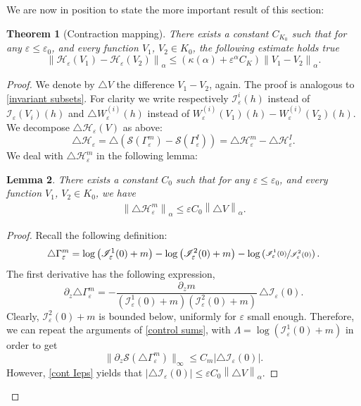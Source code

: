 \documentclass[10pt]{amsart}
\let\mathcal\mathscr
\newcommand{\cI}{\mathcal{I}}
\newcommand{\cS}{\mathcal{S}}
\theoremstyle{plain}
\newtheorem{thm}{Theorem}[section]
\newtheorem{lem}[thm]{Lemma}
\theoremstyle{definition}
\renewcommand{\H}{\mathcal{H}_\eps}
\let\eps\varepsilon
\newcommand{\nalph}[1]{\left\lVert#1\right\rVert_\alpha}
\newcommand{\Gammam}{\Gamma^m_{\eps}}
\newcommand{\GammaI}{\Gamma^I_{\eps}}
\begin{document}
We are now in position to state the more important result of this section:

\begin{thm}[Contraction mapping]\label{contraction mapping}
There exists a constant $C_{K_0}$ such that for any $\eps\leq \eps_0$, and every function $V_1$, $V_2 \in K_0$, the following estimate holds true
\begin{equation}\label{eq: contraction th}
\nalph{ \H(V_1)- \H(V_2)} \leq (\kappa(\alpha) + \eps^\alpha C_K)\nalph{V_1-V_2}.
\end{equation}
\end{thm}
\begin{proof}
We denote by $\triangle V$ the difference $V_1 - V_2$, again.
The proof is analogous to \cref{invariant subsets}.
For clarity we write respectively $\cI_\eps^i(h) $ instead of $\cI_\eps(V_i) (h)$ and $\triangle W_\eps^{(i)}(h)$ instead of $W_\eps^{(i)}(V_1) (h)-W_\eps^{(i)}(V_2) (h)$.
We decompose $ \triangle \H(V)$ as above:
\begin{equation*}
\triangle \H = \triangle \left (\cS(\Gammam) - \cS(\GammaI)\right) = \triangle \H^m - \triangle \H^I.
\end{equation*}
We deal with $\triangle \H^m$ in the following lemma:
\begin{lem}\label{unif bound affpart diff}
There exists a constant $C_{0}$ such that for any $\eps\leq \eps_0$, and every function $V_1$, $V_2 \in K_0$, we have
\begin{align*}
\nalph{\triangle \H^m} \leq \eps C_0 \nalph{ \triangle V }.
\end{align*}
\end{lem}

\begin{proof}
Recall the following definition:
\begin{equation*}
\triangle \Gammam = \log\left (\cI_\eps^1(0) + m \right) - \log\left (\cI_\eps^2(0) + m \right) - \log\left (\sfrac{\cI_\eps^1(0) }{\cI_\eps^2(0) } \right).
\end{equation*}
The first derivative has the following expression,
\begin{equation}\label{eq:triangle gammam}
\partial_z \triangle \Gammam = - \dfrac{\partial_z m}{(\cI_\eps^1(0) + m)(\cI_\eps^2(0) + m)}\, \triangle \cI_\eps(0).
\end{equation}
Clearly, $\cI_\eps^2(0) + m$ is bounded below, uniformly for $\eps$ small enough. Therefore, we can repeat the arguments of \cref{control sums}, with $\Lambda = \log(\cI_\eps^1(0) + m)$ in order to get
\begin{equation*}
\|\partial_z \cS(\triangle \Gammam)\|_{\infty} \leq
C_m |\triangle \cI_\eps(0)|.
\end{equation*}
However, \cref{cont Ieps} yields that $|\triangle \cI_\eps(0)| \leq \eps C_{0} \nalph{\triangle V}$.


\end{proof}
\end{proof}
\end{document}
